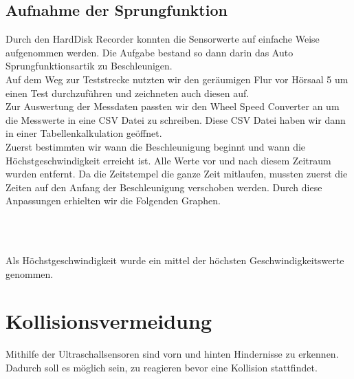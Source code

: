 \documentclass[a4paper,12pt]{report}
\begin{document}
	\section{Aufnahme der Sprungfunktion}
	Durch den HardDisk Recorder konnten die Sensorwerte auf einfache Weise aufgenommen werden. Die Aufgabe bestand so dann darin das Auto Sprungfunktionsartik zu Beschleunigen. \\ 
	Auf dem Weg zur Teststrecke nutzten wir den geräumigen Flur vor Hörsaal 5 um einen Test durchzuführen und zeichneten auch diesen auf. \\
	Zur Auswertung der Messdaten passten wir den Wheel Speed Converter an um die Messwerte in eine CSV Datei zu schreiben. Diese CSV Datei haben wir dann in einer Tabellenkalkulation geöffnet. \\
	Zuerst bestimmten wir wann die Beschleunigung beginnt und wann die Höchstgeschwindigkeit erreicht ist. Alle Werte vor und nach diesem Zeitraum wurden entfernt. Da die Zeitstempel die ganze Zeit mitlaufen, mussten zuerst die Zeiten auf den Anfang der Beschleunigung verschoben werden. Durch diese Anpassungen erhielten wir die Folgenden Graphen.\\
	\\
	\\
	Als Höchstgeschwindigkeit wurde ein mittel der höchsten Geschwindigkeitswerte genommen.
	

\chapter{Kollisionsvermeidung}

	Mithilfe %
	der Ultraschallsensoren sind vorn und hinten Hindernisse zu erkennen.
	Dadurch soll es möglich sein, zu reagieren bevor eine Kollision stattfindet.
\end{document}
